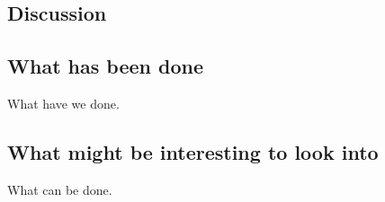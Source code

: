 \documentclass[a4paper,11pt]{article}
\begin{document}
\begin{multicols}{2}
\section{Discussion}
	\subsection{What has been done}
	What have we done.
	\subsection{What might be interesting to look into}
	What can be done.
\end{multicols}
\begin{verbatim}

\end{verbatim}
\end{document}
